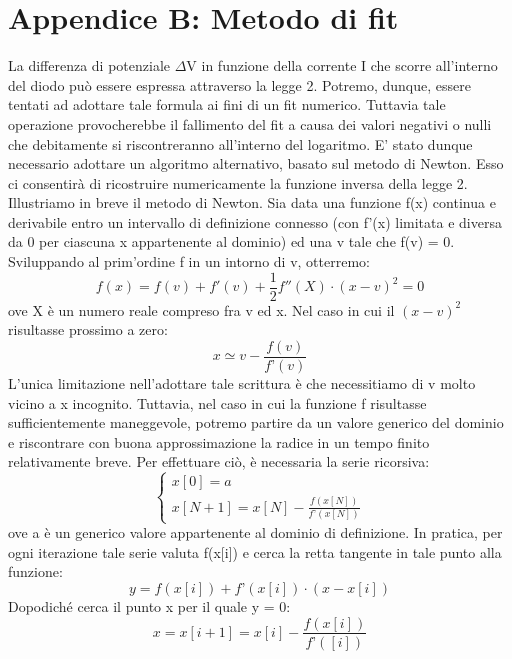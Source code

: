 \documentclass{article}[a4paper, oneside, 11pt]
\begin{document}
\section{Appendice B: Metodo di fit}\label{app: B}
La differenza di potenziale $\Delta$V in funzione della corrente I che scorre all’interno del diodo può essere espressa attraverso la legge 2. Potremo, dunque, essere tentati ad adottare tale formula ai fini di un fit numerico. Tuttavia tale operazione provocherebbe il fallimento del fit a causa dei valori negativi o nulli che debitamente si riscontreranno all’interno del logaritmo. E’ stato dunque necessario adottare un algoritmo alternativo, basato sul metodo di Newton\cite{tesi}. Esso ci consentirà di ricostruire numericamente la funzione inversa della legge 2.
Illustriamo in breve il metodo di Newton. Sia data una funzione f(x) continua e derivabile entro un intervallo di definizione connesso (con f’(x) limitata e diversa da 0 per ciascuna x appartenente al dominio) ed una v tale che f(v) = 0. Sviluppando al prim’ordine f in un intorno di v, otterremo:
\begin{equation}
f(x) = f(v) + f{'}(v) + {\frac{1}{2}} {f{''}(X)} \cdot  {( x - v)^2} = 0
\end{equation}
ove X è un numero reale compreso fra v ed x. Nel caso in cui il $(x-v)^2 $risultasse prossimo a zero:
\begin{equation}
x \simeq v   -  {\frac {f(v)}{f’(v)}}
\end{equation}
L’unica limitazione nell’adottare tale scrittura è che necessitiamo di v molto vicino a x incognito. Tuttavia, nel caso in cui la funzione f risultasse sufficientemente maneggevole, potremo partire da un valore generico del dominio e riscontrare con buona approssimazione la radice in un tempo finito relativamente breve. Per effettuare ciò, è necessaria la serie ricorsiva:
\begin{equation}
\begin{cases}
x[0] = a \\ x[N+1] = x[N] - \frac {f(x[N])} {f’(x[N])}
\end{cases}
\end{equation}
ove a è un generico valore appartenente al dominio di definizione. In pratica, per ogni iterazione tale serie valuta f(x[i]) e cerca la retta tangente in tale punto alla funzione:
\begin{equation}
y = f(x[i]) + f’(x[i]) \cdot (x-x[i])
\end{equation}
 Dopodiché cerca il punto x per il quale y = 0:
\begin{equation}
x = x[i+1] = x[i] - \frac{f(x[i])}{f’([i])}
\end{equation}
\end{document}
